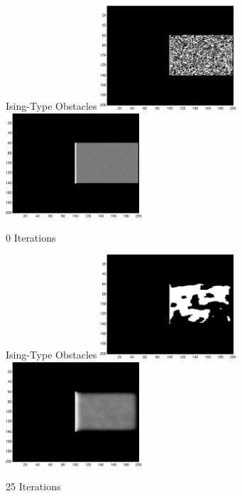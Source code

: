 \begin{tframe}{Ising-Type Obstacles}
\includegraphics[width=2in]{media_exploration/ising000}
\includegraphics[width=2in]{media_exploration/marg000}

0 Iterations
\end{tframe}

\addtocounter{framenumber}{-1}
\begin{tframe}{Ising-Type Obstacles}
\includegraphics[width=2in]{media_exploration/ising025}
\includegraphics[width=2in]{media_exploration/marg025}

25 Iterations
\end{tframe}

